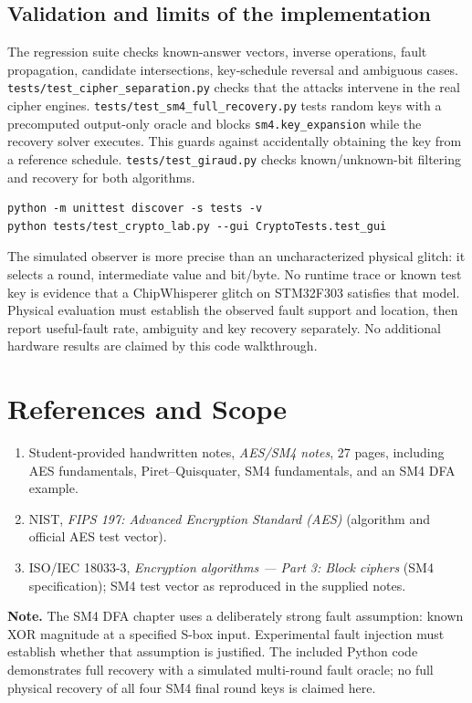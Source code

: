 \documentclass[11pt,a4paper]{report}
\newcommand{\note}[1]{\par\smallskip\noindent\colorbox{pale}{\parbox{0.94\linewidth}{\textbf{Note.} #1}}\par\smallskip}
\begin{document}
\section{Validation and limits of the implementation}
The regression suite checks known-answer vectors, inverse operations, fault propagation, candidate intersections, key-schedule reversal and ambiguous cases. \texttt{tests/test\_cipher\_separation.py} checks that the attacks intervene in the real cipher engines. \texttt{tests/test\_sm4\_full\_recovery.py} tests random keys with a precomputed output-only oracle and blocks \texttt{sm4.key\_expansion} while the recovery solver executes. This guards against accidentally obtaining the key from a reference schedule. \texttt{tests/test\_giraud.py} checks known/unknown-bit filtering and recovery for both algorithms.
\begin{lstlisting}[style=terminal]
python -m unittest discover -s tests -v
python tests/test_crypto_lab.py --gui CryptoTests.test_gui
\end{lstlisting}
The simulated observer is more precise than an uncharacterized physical glitch: it selects a round, intermediate value and bit/byte. No runtime trace or known test key is evidence that a ChipWhisperer glitch on STM32F303 satisfies that model. Physical evaluation must establish the observed fault support and location, then report useful-fault rate, ambiguity and key recovery separately. No additional hardware results are claimed by this code walkthrough.

\chapter*{References and Scope}
\begin{enumerate}
\item Student-provided handwritten notes, \emph{AES/SM4 notes}, 27 pages, including AES fundamentals, Piret--Quisquater, SM4 fundamentals, and an SM4 DFA example.
\item NIST, \emph{FIPS 197: Advanced Encryption Standard (AES)} (algorithm and official AES test vector).
\item ISO/IEC 18033-3, \emph{Encryption algorithms --- Part 3: Block ciphers} (SM4 specification); SM4 test vector as reproduced in the supplied notes.
\end{enumerate}
\note{The SM4 DFA chapter uses a deliberately strong fault assumption: known XOR magnitude at a specified S-box input. Experimental fault injection must establish whether that assumption is justified. The included Python code demonstrates full recovery with a simulated multi-round fault oracle; no full physical recovery of all four SM4 final round keys is claimed here.}
\end{document}
